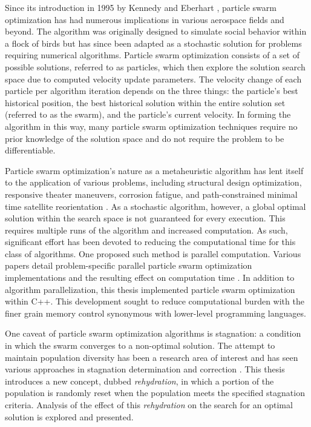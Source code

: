 \noindent Since its introduction in 1995 by Kennedy and Eberhart \citep{Initial_PSO}, particle swarm optimization has had numerous implications in various aerospace fields and beyond.
The algorithm was originally designed to simulate social behavior within a flock of birds but has since been adapted as a stochastic solution for problems
requiring numerical algorithms. Particle swarm optimization consists of a set of possible solutions, referred to as particles, which then explore the solution search space due to
computed velocity update parameters. The velocity change of each particle per algorithm iteration depends on the three things: the particle's best historical position, the best historical
solution within the entire solution set (referred to as the swarm), and the particle's current velocity. In forming the algorithm in this way, many particle swarm optimization techniques 
require no prior knowledge of the solution space and do not require the problem to be differentiable. \newline

\noindent Particle swarm optimization's nature as a metaheuristic algorithm has lent itself to the application of various problems,
including structural design optimization, responsive theater maneuvers, corrosion fatigue, and path-constrained minimal time satellite reorientation
\citep{PSO1, PSO2, PSO3, PSO4}. As a stochastic algorithm, however, a global optimal solution within the search space is not guaranteed for every execution. 
This requires multiple runs of the algorithm and increased computation. As such, significant effort has been devoted to reducing the computational time for this class of
algorithms. One proposed such method is parallel computation. Various papers detail problem-specific parallel particle swarm optimization implementations and the resulting 
effect on computation time \citep{PPSO1, PPSO2, PPSO3}. In addition to algorithm parallelization, this thesis implemented particle swarm optimization within C++.
This development sought to reduce computational
burden with the finer grain memory control synonymous with lower-level programming languages. \newline

\noindent One caveat of particle swarm optimization algorithms is stagnation: a condition in which the swarm converges to a non-optimal solution. The attempt to maintain population 
diversity has been a research area of interest and has seen various approaches in stagnation determination and correction \citep{PSOstag1, PSOstag2}. This thesis introduces a new concept,
dubbed \textit{rehydration}, in which a portion of the population is randomly reset when the population meets the specified stagnation criteria. Analysis of the effect of this
\textit{rehydration} on the search for an optimal solution is explored and presented.



